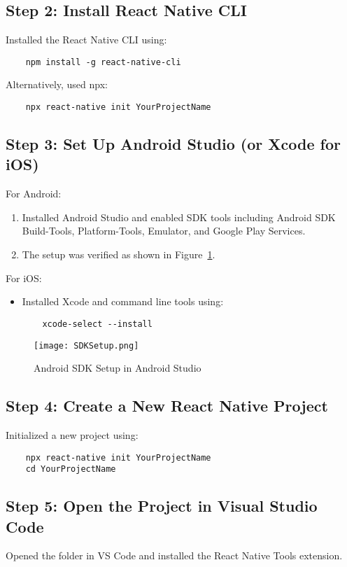 \documentclass{article}
\begin{document}
\subsection{Step 2: Install React Native CLI}
Installed the React Native CLI using:
\begin{verbatim}
    npm install -g react-native-cli
\end{verbatim}
Alternatively, used npx:
\begin{verbatim}
    npx react-native init YourProjectName
\end{verbatim}

\subsection{Step 3: Set Up Android Studio (or Xcode for iOS)}
For Android:
\begin{enumerate}
    \item Installed Android Studio and enabled SDK tools including Android SDK Build-Tools, Platform-Tools, Emulator, and Google Play Services.
    \item The setup was verified as shown in Figure~\ref{fig:sdk_setup}.
\end{enumerate}
For iOS:
\begin{itemize}
    \item Installed Xcode and command line tools using:
    \begin{verbatim}
    xcode-select --install
    \end{verbatim}
\end{itemize}

\begin{figure}[H]
    \centering
    \texttt{[image: SDKSetup.png]}
    \caption{Android SDK Setup in Android Studio}
    \label{fig:sdk_setup}
\end{figure}

\subsection{Step 4: Create a New React Native Project}
Initialized a new project using:
\begin{verbatim}
    npx react-native init YourProjectName
    cd YourProjectName
\end{verbatim}

\subsection{Step 5: Open the Project in Visual Studio Code}
Opened the folder in VS Code and installed the React Native Tools extension.
\end{document}
